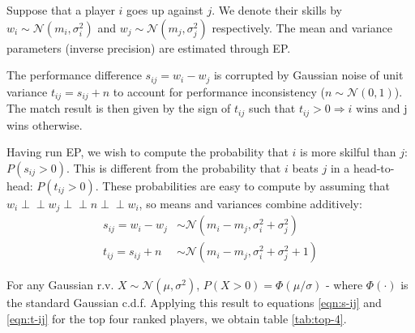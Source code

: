 \documentclass[]{article}
\newcommand{\Ncal}{\mathcal{N}}
\newcommand{\indep}{\perp \!\!\! \perp}
\begin{document}
Suppose that a player $i$ goes up against $j$. We denote their skills by $w_i \sim \Ncal(m_i, \sigma_i^2)$ and $w_j \sim \Ncal(m_j, \sigma_j^2)$ respectively. The mean and variance parameters (inverse precision) are estimated through EP. 

The performance difference $s_{ij} = w_i - w_j$ is corrupted by Gaussian noise of unit variance $t_{ij} = s_{ij} + n$ to account for performance inconsistency ($n \sim \Ncal(0, 1)$). The match result is then given by the sign of $t_{ij}$ such that $t_{ij} > 0 \Rightarrow i \text{ wins}$ and j wins otherwise.

Having run EP, we wish to compute the probability that $i$ is more skilful than $j$: $P(s_{ij} > 0)$. This is different from the probability that $i$ beats $j$ in a head-to-head: $P(t_{ij} > 0)$. These probabilities are easy to compute by assuming that $w_i \indep w_j \indep n \indep w_i$, so means and variances combine additively:
%
\begin{align}
		s_{ij} = w_i - w_j &\sim \Ncal(m_i - m_j, \sigma_i^2 + \sigma_j^2)
		\label{eqn:s-ij} \\	
		t_{ij} = s_{ij} + n &\sim \Ncal(m_i - m_j, \sigma_i^2 + \sigma_j^2 + 1)
		\label{eqn:t-ij}
\end{align}

For any Gaussian r.v. $X \sim \Ncal(\mu, \sigma^2)$, $P(X > 0) = \Phi(\mu / \sigma)$ - where $\Phi(\cdot)$ is the standard Gaussian c.d.f. Applying this result to equations \ref{eqn:s-ij} and \ref{eqn:t-ij} for the top four ranked players, we obtain table \ref{tab:top-4}.
\end{document}
